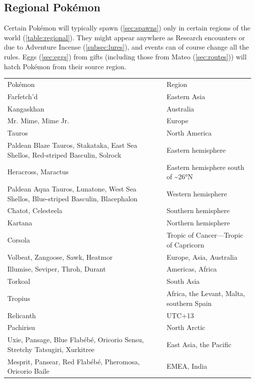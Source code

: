 \subsection{Regional Pokémon\label{subsec:regional}}
Certain Pokémon will typically spawn (\autoref{sec:spawns}) only in certain regions of the world (\autoref{table:regional}).
They might appear anywhere as Research encounters or due to Adventure Incense (\autoref{subsec:lures}),
 and events can of course change all the rules.
Eggs (\autoref{sec:eggs}) from gifts (including those from Mateo (\autoref{sec:routes})) will
 hatch Pokémon from their source region.
\begin{table}
\centering
\footnotesize
\nohyphenation
  \begin{tabular}{p{}l}
Pokémon & Region \\
\Midrule
Farfetch'd & Eastern Asia\\
\rowcolor{Gray!25}
Kangaskhan & Australia\\
Mr. Mime, Mime Jr. & Europe\\
\rowcolor{Gray!25}
Tauros & North America\\
Paldean Blaze Tauros, Stakataka, East Sea Shellos, Red-striped Basculin, Solrock & Eastern hemisphere\\
\rowcolor{Gray!25}
Heracross, Maractus & Eastern hemisphere south of \textasciitilde\ang{26}N\\
Paldean Aqua Tauros, Lunatone, West Sea Shellos, Blue-striped Basculin, Blacephalon & Western hemisphere\\
\rowcolor{Gray!25}
Chatot, Celesteela & Southern hemisphere\\
Kartana & Northern hemisphere\\
\rowcolor{Gray!25}
Corsola & Tropic of Cancer---Tropic of Capricorn\\
Volbeat, Zangoose, Sawk, Heatmor & Europe, Asia, Australia\\
\rowcolor{Gray!25}
Illumise, Seviper, Throh, Durant & Americas, Africa\\
Torkoal & South Asia\\
\rowcolor{Gray!25}
Tropius & Africa, the Levant, Malta, southern Spain\\
Relicanth & UTC+13\\
\rowcolor{Gray!25}
Pachirisu & North Arctic\\
Uxie, Pansage, Blue Flabébé, Oricorio Sensu, Stretchy Tatsugiri, Xurkitree & East Asia, the Pacific\\
\rowcolor{Gray!25}
Mesprit, Pansear, Red Flabébé, Pheromosa, Oricorio Baile & EMEA, India\\

\end{tabular}
\end{table}
